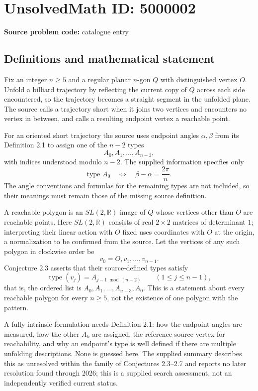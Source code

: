 \documentclass[11pt]{article}
\begin{document}
\section*{UnsolvedMath ID: 5000002}
\textbf{Source problem code:} catalogue entry
\subsection{Definitions and mathematical statement}
Fix an integer \(n\ge5\) and a regular planar \(n\)-gon \(Q\) with distinguished vertex \(O\). Unfold a billiard trajectory by reflecting the current copy of \(Q\) across each side encountered, so the trajectory becomes a straight segment in the unfolded plane. The source calls a trajectory short when it joins two vertices and encounters no vertex in between, and calls a resulting endpoint vertex a reachable point.

For an oriented short trajectory the source uses endpoint angles \(\alpha,\beta\) from its Definition 2.1 to assign one of the \(n-2\) types
\[
 A_0,A_1,\ldots,A_{n-3},
\]
with indices understood modulo \(n-2\). The supplied information specifies only
\[
 \text{type }A_0\quad\Longleftrightarrow\quad\beta-\alpha=\frac{2\pi}{n}.
\]
The angle conventions and formulas for the remaining types are not included, so their meanings must remain those of the missing source definition.

A reachable polygon is an \(SL(2,\mathbb R)\) image of \(Q\) whose vertices other than \(O\) are reachable points. Here \(SL(2,\mathbb R)\) consists of real \(2\times2\) matrices of determinant \(1\); interpreting their linear action with \(O\) fixed uses coordinates with \(O\) at the origin, a normalization to be confirmed from the source. Let the vertices of any such polygon in clockwise order be
\[
 v_0=O,v_1,\ldots,v_{n-1}.
\]
Conjecture 2.3 asserts that their source-defined types satisfy
\[
 \operatorname{type}(v_j)=A_{j-1\bmod(n-2)}\qquad(1\le j\le n-1),
\]
that is, the ordered list is \(A_0,A_1,\ldots,A_{n-3},A_0\). This is a statement about every reachable polygon for every \(n\ge5\), not the existence of one polygon with the pattern.

A fully intrinsic formulation needs Definition 2.1: how the endpoint angles are measured, how the other \(A_k\) are assigned, the reference source vertex for reachability, and why an endpoint's type is well defined if there are multiple unfolding descriptions. None is guessed here. The supplied summary describes this as unresolved within the family of Conjectures 2.3--2.7 and reports no later resolution found through 2026; this is a supplied search assessment, not an independently verified current status.
\end{document}
